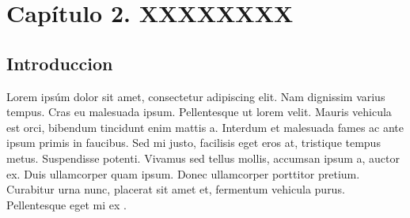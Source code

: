 \chapter{Capítulo 2. XXXXXXXX}

\section{Introduccion}

Lorem ipsúm dolor sit amet, consectetur adipiscing elit. Nam dignissim varius tempus. Cras eu malesuada ipsum. Pellentesque ut lorem velit. Mauris vehicula est orci, bibendum tincidunt enim mattis a. Interdum et malesuada fames ac ante ipsum primis in faucibus. Sed mi justo, facilisis eget eros at, tristique tempus metus. Suspendisse potenti. Vivamus sed tellus mollis, accumsan ipsum a, auctor ex. Duis ullamcorper quam ipsum. Donec ullamcorper porttitor pretium. Curabitur urna nunc, placerat sit amet et, fermentum vehicula purus. Pellentesque eget mi ex \cite{Chevalereau2}.